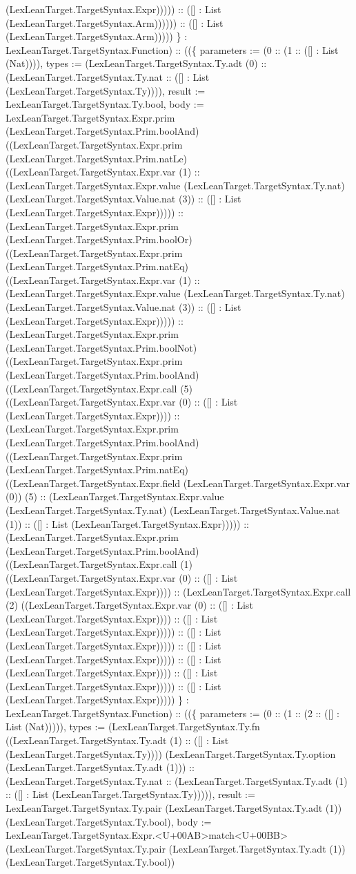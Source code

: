 \documentclass[11pt]{article}
\begin{document}
(LexLeanTarget.TargetSyntax.Expr))))) :: ([] : List (LexLeanTarget.TargetSyntax.Arm)))))) :: ([] : List (LexLeanTarget.TargetSyntax.Arm))))) \} : LexLeanTarget.TargetSyntax.Function) :: ((\{ parameters := (0 :: (1 :: ([] : List (Nat)))), types := (LexLeanTarget.TargetSyntax.Ty.adt (0) :: (LexLeanTarget.TargetSyntax.Ty.nat :: ([] : List (LexLeanTarget.TargetSyntax.Ty)))), result := LexLeanTarget.TargetSyntax.Ty.bool, body := LexLeanTarget.TargetSyntax.Expr.prim (LexLeanTarget.TargetSyntax.Prim.boolAnd) ((LexLeanTarget.TargetSyntax.Expr.prim (LexLeanTarget.TargetSyntax.Prim.natLe) ((LexLeanTarget.TargetSyntax.Expr.var (1) :: (LexLeanTarget.TargetSyntax.Expr.value (LexLeanTarget.TargetSyntax.Ty.nat) (LexLeanTarget.TargetSyntax.Value.nat (3)) :: ([] : List (LexLeanTarget.TargetSyntax.Expr))))) :: (LexLeanTarget.TargetSyntax.Expr.prim (LexLeanTarget.TargetSyntax.Prim.boolOr) ((LexLeanTarget.TargetSyntax.Expr.prim (LexLeanTarget.TargetSyntax.Prim.natEq) ((LexLeanTarget.TargetSyntax.Expr.var (1) :: (LexLeanTarget.TargetSyntax.Expr.value (LexLeanTarget.TargetSyntax.Ty.nat) (LexLeanTarget.TargetSyntax.Value.nat (3)) :: ([] : List (LexLeanTarget.TargetSyntax.Expr))))) :: (LexLeanTarget.TargetSyntax.Expr.prim (LexLeanTarget.TargetSyntax.Prim.boolNot) ((LexLeanTarget.TargetSyntax.Expr.prim (LexLeanTarget.TargetSyntax.Prim.boolAnd) ((LexLeanTarget.TargetSyntax.Expr.call (5) ((LexLeanTarget.TargetSyntax.Expr.var (0) :: ([] : List (LexLeanTarget.TargetSyntax.Expr)))) :: (LexLeanTarget.TargetSyntax.Expr.prim (LexLeanTarget.TargetSyntax.Prim.boolAnd) ((LexLeanTarget.TargetSyntax.Expr.prim (LexLeanTarget.TargetSyntax.Prim.natEq) ((LexLeanTarget.TargetSyntax.Expr.field (LexLeanTarget.TargetSyntax.Expr.var (0)) (5) :: (LexLeanTarget.TargetSyntax.Expr.value (LexLeanTarget.TargetSyntax.Ty.nat) (LexLeanTarget.TargetSyntax.Value.nat (1)) :: ([] : List (LexLeanTarget.TargetSyntax.Expr))))) :: (LexLeanTarget.TargetSyntax.Expr.prim (LexLeanTarget.TargetSyntax.Prim.boolAnd) ((LexLeanTarget.TargetSyntax.Expr.call (1) ((LexLeanTarget.TargetSyntax.Expr.var (0) :: ([] : List (LexLeanTarget.TargetSyntax.Expr)))) :: (LexLeanTarget.TargetSyntax.Expr.call (2) ((LexLeanTarget.TargetSyntax.Expr.var (0) :: ([] : List (LexLeanTarget.TargetSyntax.Expr)))) :: ([] : List (LexLeanTarget.TargetSyntax.Expr))))) :: ([] : List (LexLeanTarget.TargetSyntax.Expr))))) :: ([] : List (LexLeanTarget.TargetSyntax.Expr))))) :: ([] : List (LexLeanTarget.TargetSyntax.Expr)))) :: ([] : List (LexLeanTarget.TargetSyntax.Expr))))) :: ([] : List (LexLeanTarget.TargetSyntax.Expr))))) \} : LexLeanTarget.TargetSyntax.Function) :: ((\{ parameters := (0 :: (1 :: (2 :: ([] : List (Nat))))), types := (LexLeanTarget.TargetSyntax.Ty.fn ((LexLeanTarget.TargetSyntax.Ty.adt (1) :: ([] : List (LexLeanTarget.TargetSyntax.Ty)))) (LexLeanTarget.TargetSyntax.Ty.option (LexLeanTarget.TargetSyntax.Ty.adt (1))) :: (LexLeanTarget.TargetSyntax.Ty.nat :: (LexLeanTarget.TargetSyntax.Ty.adt (1) :: ([] : List (LexLeanTarget.TargetSyntax.Ty))))), result := LexLeanTarget.TargetSyntax.Ty.pair (LexLeanTarget.TargetSyntax.Ty.adt (1)) (LexLeanTarget.TargetSyntax.Ty.bool), body := LexLeanTarget.TargetSyntax.Expr.<U+00AB>match<U+00BB> (LexLeanTarget.TargetSyntax.Ty.pair (LexLeanTarget.TargetSyntax.Ty.adt (1)) (LexLeanTarget.TargetSyntax.Ty.bool)) 
\end{document}
